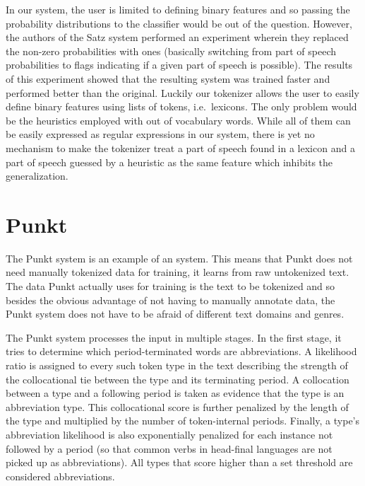 In our system, the user is limited to defining binary features and so passing
the probability distributions to the classifier would be out of the question.
However, the authors of the Satz system performed an experiment wherein they
replaced the non-zero probabilities with ones (basically switching from part of
speech probabilities to flags indicating if a given part of speech is
possible). The results of this experiment showed that the resulting system was
trained faster and performed better than the original. Luckily our tokenizer
allows the user to easily define binary features using lists of tokens, i.e.\
lexicons. The only problem would be the heuristics employed with out of
vocabulary words. While all of them can be easily expressed as regular
expressions in our system, there is yet no mechanism to make the tokenizer
treat a part of speech found in a lexicon and a part of speech guessed by a
heuristic as the same feature which inhibits the generalization.

\section{Punkt}
\label{sec:survey-punkt}

The Punkt system \cite{sbd-punkt} is an example of an \newterm{unsupervised
machine-learning} system. This means that Punkt does not need manually
tokenized data for training, it learns from raw untokenized text. The data
Punkt actually uses for training is the text to be tokenized and so besides the
obvious advantage of not having to manually annotate data, the Punkt system
does not have to be afraid of different text domains and genres.

The Punkt system processes the input in multiple stages. In the first stage, it
tries to determine which period-terminated words are abbreviations. A
likelihood ratio is assigned to every such token type in the text describing
the strength of the collocational tie between the type and its
terminating period. A collocation between a type and a following period is
taken as evidence that the type is an abbreviation type. This collocational
score is further penalized by the length of the type and multiplied by the
number of token-internal periods. Finally, a type's abbreviation likelihood is
also exponentially penalized for each instance not followed by a period (so
that common verbs in head-final languages are not picked up as abbreviations).
All types that score higher than a set threshold are considered abbreviations.

